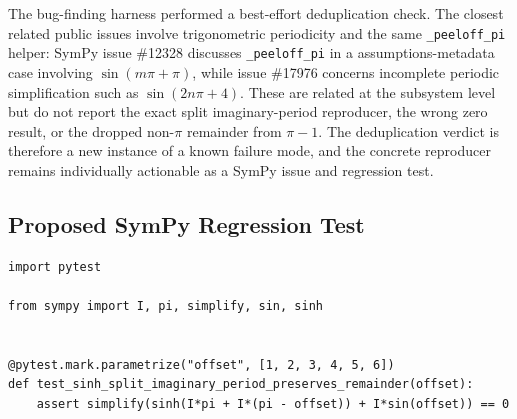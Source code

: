 \documentclass[11pt]{article}
\begin{document}
The bug-finding harness performed a best-effort deduplication check. The closest
related public issues involve trigonometric periodicity and the same
\texttt{\_peeloff\_pi} helper: SymPy issue \#12328 discusses
\texttt{\_peeloff\_pi} in a assumptions-metadata case involving
\(\sin(m\pi+\pi)\), while issue \#17976 concerns incomplete periodic
simplification such as \(\sin(2n\pi+4)\). These are related at the subsystem
level but do not report the exact split imaginary-period reproducer, the wrong
zero result, or the dropped non-\(\pi\) remainder from \(\pi-1\). The
deduplication verdict is therefore a new instance of a known failure mode, and
the concrete reproducer remains individually actionable as a SymPy issue and
regression test.

\subsection{Proposed SymPy Regression Test}

\medskip

\begin{lstlisting}[style=bugpython]
import pytest

from sympy import I, pi, simplify, sin, sinh


@pytest.mark.parametrize("offset", [1, 2, 3, 4, 5, 6])
def test_sinh_split_imaginary_period_preserves_remainder(offset):
    assert simplify(sinh(I*pi + I*(pi - offset)) + I*sin(offset)) == 0
\end{lstlisting}
\end{document}
